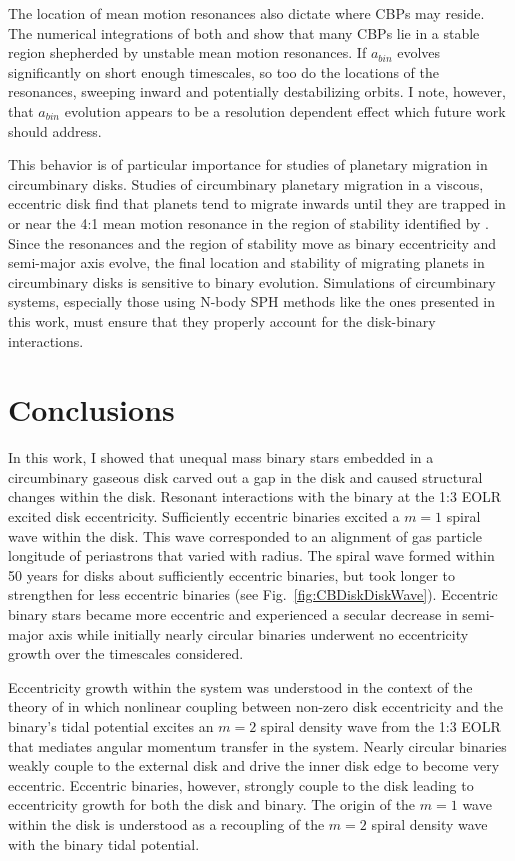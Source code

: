 The location of mean motion resonances also dictate where CBPs may reside.  The numerical integrations 
of both \citet{Popova2013} and \citet{Chavez2015} show that many CBPs lie in a stable region shepherded by unstable mean motion resonances.  If 
$a_{bin}$ evolves significantly on short enough timescales, so too do the locations of the resonances, sweeping inward and potentially destabilizing orbits.  
I note, however, that $a_{bin}$ evolution appears to be a resolution dependent effect which future work should address.

This behavior is of particular importance for studies of planetary migration in circumbinary disks.  Studies of circumbinary planetary migration in a viscous, 
eccentric disk find that planets tend to migrate inwards until they are trapped in or near the 4:1 mean motion resonance in the region of stability identified by 
\citet{Holman1999} \citep{Nelson2003,Kley2014}.  Since the resonances and the region of stability move as binary eccentricity and semi-major axis evolve, the 
final location and stability of migrating planets in circumbinary disks is sensitive to binary evolution.  Simulations of circumbinary systems, especially those 
using N-body SPH methods like the ones presented in this work, must ensure that they properly account for the disk-binary interactions.

\section{Conclusions}

In this work, I showed that unequal mass binary stars embedded in a circumbinary gaseous disk carved out a gap in the disk and caused structural changes 
within the disk.  Resonant interactions with the binary at the 1:3 EOLR excited disk eccentricity.  Sufficiently eccentric binaries excited a $m = 1$ spiral 
wave within the disk.  This wave corresponded to an alignment of gas particle longitude of periastrons that varied with radius.  The spiral wave formed within 50 
years for disks about sufficiently eccentric binaries, but took longer to strengthen for less eccentric binaries (see Fig.~\ref{fig:CBDiskDiskWave}).  Eccentric binary stars 
became more eccentric and experienced a secular decrease in semi-major axis while initially nearly circular binaries underwent no eccentricity growth over the 
timescales considered.

Eccentricity growth within the system was understood in the context of the theory of \citet{Papaloizou2001} in which nonlinear coupling between non-zero disk 
eccentricity and the binary's tidal potential excites an $m = 2$ spiral density wave from the 1:3 EOLR that mediates angular momentum transfer in the system.  
Nearly circular binaries weakly couple to the external disk and drive the inner disk edge to become very eccentric.  Eccentric binaries, however, strongly couple 
to the disk leading to eccentricity growth for both the disk and binary.  The origin of the $m = 1$ wave within the disk is understood as a recoupling of the $m = 
2$ spiral density wave with the binary tidal potential.

